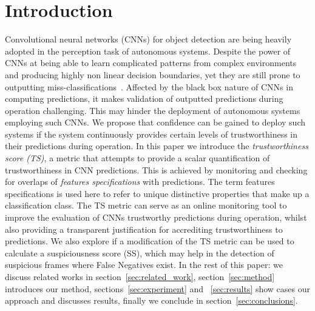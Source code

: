 
\section{Introduction}
Convolutional neural networks (CNNs) for object detection are being  heavily adopted in the perception task of autonomous systems.
%
Despite the power of CNNs at being able to learn complicated patterns from complex environments and producing highly non linear decision boundaries, yet they are still prone to outputting miss-classifications~\cite{Ghobrial2022}. 
%
Affected by the black box nature of CNNs in computing predictions, it makes validation of outputted predictions during operation challenging.
%
This may hinder the deployment of autonomous systems employing such CNNs.
%
We propose that confidence can be gained to deploy such systems if the system continuously provides certain levels of trustworthiness in their predictions during operation.
%
In this paper we introduce the \textit{trustworthiness score (TS)}, a metric that attempts to provide a scalar quantification of trustworthiness in CNN predictions. 
%
This is achieved by monitoring and checking for overlaps of \textit{features specifications} with predictions. 
%
The term features specifications is used here to refer to unique distinctive properties that make up a classification class.
%  
%
The TS metric can serve as an online monitoring tool to improve the evaluation of CNNs trustworthy predictions during operation, whilst also providing a transparent justification for accrediting trustworthiness to predictions. We also explore if a modification of the TS metric can be used to calculate a suspiciousness score (SS), which may help in the detection of suspicious frames where False Negatives exist.
%
%
In the rest of this paper: we discuss related works in section~\ref{sec:related_work}, section~\ref{sec:method} introduces our method,
%
sections~\ref{sec:experiment} and ~\ref{sec:results} show cases our approach and discusses results, finally we conclude in section~\ref{sec:conclusions}.

